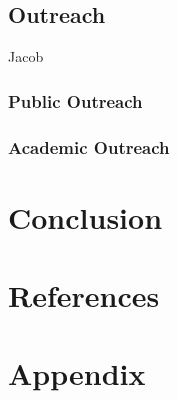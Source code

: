 \documentclass[12pt]{article}
\begin{document}
\subsection{Outreach}
Jacob
\subsubsection{Public Outreach}
\subsubsection{Academic Outreach}

\section{Conclusion}

\newpage
\section{References}



\section{Appendix}
\end{document}
